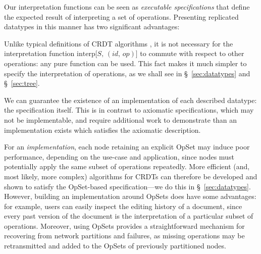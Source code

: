 Our interpretation functions can be seen as \emph{executable specifications} that define the expected result of interpreting a set of operations.
Presenting replicated datatypes in this manner has two significant advantages:
\begin{enumerate*}
\item
Unlike typical definitions of CRDT algorithms \cite{Shapiro:2011wy,Shapiro:2011un}, it is not necessary for the interpretation function $\mathrm{interp}\big[S,\, (\mathit{id},\, \mathit{op})\big]$ to commute with respect to other operations: any pure function can be used.
This fact makes it much simpler to specify the interpretation of operations, as we shall see in \S~\ref{sec:datatypes} and \S~\ref{sec:tree}.
\item
We can guarantee the existence of an implementation of each described datatype: the specification itself.
This is in contrast to axiomatic specifications, which may not be implementable, and require additional work to demonstrate than an implementation exists which satisfies the axiomatic description.
\end{enumerate*}

For an \emph{implementation}, each node retaining an explicit OpSet may induce poor performance, depending on the use-case and application, since nodes must potentially apply the same subset of operations repeatedly.
More efficient (and, most likely, more complex) algorithms for CRDTs can therefore be developed and shown to satisfy the OpSet-based specification---we do this in \S~\ref{sec:datatypes}.
However, building an implementation around OpSets does have some advantages: for example, users can easily inspect the editing history of a document, since every past version of the document is the interpretation of a particular subset of operations.
Moreover, using OpSets provides a straightforward mechanism for recovering from network partitions and failures, as missing operations may be retransmitted and added to the OpSets of previously partitioned nodes.
